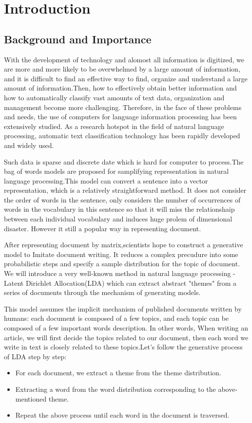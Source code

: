 \afterpage{\blankpage}

\chapter{Introduction}\label{s-intro}

\section{Background and Importance}
With the development of technology and alomost all information is digitized, we are more and more likely to be overwhelmed by a large amount of information, and it is difficult to find an effective way to find, organize and understand a large amount of information{\cite{intro-back}}.Then, how to effectively obtain better information and how to automatically classify vast amounts of text data, organization and management become more challenging. Therefore, in the face of these problems and needs, the use of computers for language information processing has been extensively studied. As a research hotspot in the field of natural language processing, automatic text classification technology has been rapidly developed and widely used.


Such data is sparse and discrete date which is hard for computer to process.The bag of words models are proposed for samplifying representation in natural language processing.This model can convert a sentence into a vector representation, which is a relatively straightforward method. It does not consider the order of words in the sentence, only considers the number of occurrences of words in the vocabulary in this sentence so that it will miss the relationshaip between each individual vocabulary and induces huge prolem of dimensional disaster. However it still a popular way in representing document.

After representing document by matrix,scientists hope to construct a generative model to
Imitate document writing. It reduces a complex precudure into some probabilistic steps and specify a sample  distribution for the topic of  document\cite{find}. We will introduce  a very well-known method in natural language processing - Latent Dirichlet Allocation(LDA) which can extract  abstract "themes"  from a series of documents through the mechanism of generating models.


This model assumes the implicit mechanism of published documents written by humans: each document is composed of a few topics, and each topic can be composed of a few important words description. In other words, When writing an article, we will first decide the topics related to our document, then each word we write in text is closely related to these topics.Let's follow the generative process of LDA step by step:
\begin{itemize}
  \item For each document, we extract a theme from the theme distribution.
  \item Extracting a word from the word distribution corresponding to the above-mentioned theme.
  \item Repeat the above process until each word in the document is traversed.
\end{itemize}

